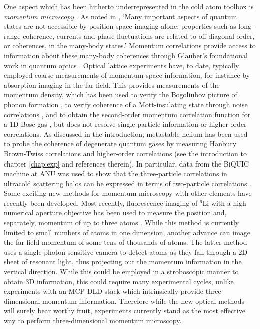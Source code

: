 	One aspect which has been hitherto underrepresented in the cold atom toolbox is \emph{momentum microscopy} \cite{Ott16}.
	As noted in \cite{Bergschneider18}, `Many important aspects of quantum states are not accessible by position-space imaging alone: properties such as long-range coherence, currents and phase fluctuations are related to off-diagonal order, or coherences, in the many-body states.'
	Momentum correlations provide access to information about these many-body coherences through Glauber's foundational work in quantum optics \cite{Glauber63,Naraschewski99}.
	Optical lattice experiments have, to date, typically employed coarse measurements of momentum-space information, for instance by absorption imaging in the far-field.
	This provides measurements of the momentum density, which has been used to verify the Bogoliubov picture of phonon formation \cite{Vogels02}, to verify coherence of a Mott-insulating state through noise correlations \cite{Folling05}, and to obtain the second-order momentum correlation function for a 1D Bose gas \cite{Fang16}, but does not resolve single-particle information or higher-order correlations.
	As discussed in the introduction, metastable helium has been used to probe the coherence of degenerate quantum gases by measuring Hanbury Brown-Twiss correlations and higher-order correlations (see the introduction to chapter \ref{chap:exp} and references therein).
	In particular, data from the BiQUIC machine at ANU was used to show that the three-particle correlations in ultracold scattering halos can be expressed in terms of two-particle correlations \cite{Hodgman17}.	
	Some exciting new methods for momentum microscopy with other elements have recently been developed. 
	Most recently, fluorescence imaging of $^6$Li with a high numerical aperture objective has been used to measure the position and, separately, momentum of up to three atoms  \cite{Bergschneider18}. 
	While this method is currently limited to small numbers of atoms in one dimension, another advance \cite{Bucker09} can image the far-field momentum of some tens of thousands of atoms.
	The latter method uses a single-photon sensitive camera to detect atoms as they fall through a 2D sheet of resonant light, thus projecting out the momentum information in the vertical direction. 
	While this could be employed in a stroboscopic manner to obtain 3D information, this could require many experimental cycles, unlike \mhe experiments with an MCP-DLD stack which intrinsically provide three-dimensional momentum information.
	Therefore while the new optical methods will surely bear worthy fruit, \mhe experiments currently stand as the most effective way to perform three-dimensional momentum microscopy.
	
